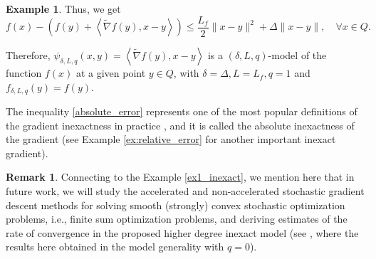 \documentclass[11pt]{amsart}
\theoremstyle{definition}
\newtheorem{example}[theorem]{Example}
\newtheorem{remark}[theorem]{Remark}
\numberwithin{equation}{section}
\begin{document}
\begin{example}
Thus, we get
\begin{equation}
    f(x) - \left(f(y) + \left\langle \widetilde{\nabla}f(y), x - y \right\rangle\right) \leq \frac{L_f}{2} \|x - y\|^2 + \Delta \|x - y\|, \quad \forall x \in Q. 
\end{equation}

Therefore, $\psi_{\delta, L, q} (x,y) =\left\langle \widetilde{\nabla}f(y), x - y \right\rangle $ is a $(\delta, L, q)$-model of the function $f(x)$ at a given point $y \in Q$, with $\delta = \Delta, L = L_f, q = 1$ and $f_{\delta, L, q} (y) = f(y)$. 

The inequality \eqref{absolute_error} represents one of the most popular definitions of the gradient inexactness in practice \cite{Polyak1987book}, and it is called the absolute inexactness of the gradient (see Example \ref{ex:relative_error} for another important inexact gradient).  
\end{example}

\begin{remark}
Connecting to the Example \ref{ex1_inexact}, we mention here that in future work, we will study the accelerated and non-accelerated stochastic gradient descent methods for solving smooth (strongly) convex stochastic optimization problems, i.e., finite sum optimization problems, and deriving estimates of the rate of convergence in the proposed higher degree inexact model (see \cite{Dvinskikh2020Accelerated}, where the results here obtained in the model generality with $q = 0$). 
\end{remark}
\end{document}
